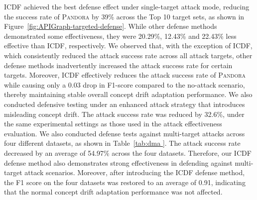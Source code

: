 \documentclass[lettersize,journal]{IEEEtran}
\newcommand{\pandora}{{\scshape Pandora}\xspace}
\begin{document}
ICDF achieved the best defense effect under single-target attack mode, reducing the success rate of \pandora by 39\% across the Top 10 target sets, as shown in Figure~\ref{fig:APIGraph-targeted-defense}. 
While other defense methods demonstrated some effectiveness, they were 20.29\%, 12.43\% and 22.43\% less effective than ICDF, respectively.
We observed that, with the exception of ICDF, which consistently reduced the attack success rate across all attack targets, other defense methods inadvertently increased the attack success rate for certain targets.
Moreover, ICDF effectively reduces the attack success rate of \pandora while causing only a 0.03 drop in F1-score compared to the no-attack scenario, thereby maintaining stable overall concept drift adaptation performance.
We also conducted defensive testing under an enhanced attack strategy that introduces misleading concept drift.
The attack success rate was reduced by 32.6\%, under the same experimental settings as those used in the attack effectiveness evaluation.
We also conducted defense tests against multi-target attacks across four different datasets, as shown in Table~\ref{tab:dma }.
The attack success rate decreased by an average of 54.97\% across the four datasets.
Therefore, our ICDF defense method also demonstrates strong effectiveness in defending against multi-target attack scenarios.
Moreover, after introducing the ICDF defense method, the F1 score on the four datasets was restored to an average of 0.91, indicating that the normal concept drift adaptation performance was not affected.
\begin{table}[htbp]
	\caption{ICDF Defense (Multi-Target \pandora)}
	\label{tab:dma }
	\setlength{\tabcolsep}{5.8pt}
	\begin{center}
	\end{center}
\end{table}
\end{document}
